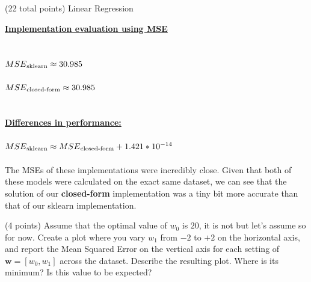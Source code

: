 \documentclass[12pt]{article}
\begin{document}
\begin{question}{(22 total points) Linear Regression}
\begin{subquestion}
\begin{answerbox}{22em}
\large{\textbf{\underline{Implementation evaluation using MSE}}}\\
\\
\\
\normalsize{
$MSE\textsubscript{sklearn} \approx 30.985$\\
\\
$MSE\textsubscript{closed-form} \approx 30.985$\\
\\
\\
\textbf{\underline{Differences in performance:}}\\
\\
$MSE\textsubscript{sklearn} \approx MSE\textsubscript{closed-form}   +   1.421 * 10^{-14}$\\
\\
The MSEs of these implementations were incredibly close. Given that both of these models were calculated on the exact same dataset, we can see that the solution of our \textbf{closed-form} implementation was a tiny bit more accurate than that of our sklearn implementation.
}
\end{answerbox}



\end{subquestion}




%
%
\begin{subquestion}{(4 points) Assume that the optimal value of $w_0$ is $20$, it is not but let's assume so for now. 
Create a plot where you vary $w_1$ from $-2$ to $+2$ on the horizontal axis, and report the Mean Squared Error on the vertical axis for each setting of $\mathbf{w} = [w_0, w_1]$ across the dataset. 
Describe the resulting plot. Where is its minimum? Is this value to be expected?\\ 
}



\end{subquestion}
\end{question}
\end{document}
